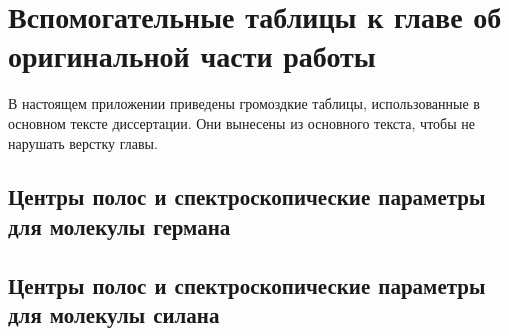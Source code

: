 \chapter{Вспомогательные таблицы к главе об оригинальной части работы}\label{app:ch2_tables}\label{app:si_tables}

В настоящем приложении приведены громоздкие таблицы, использованные в основном тексте диссертации. Они вынесены
из основного текста, чтобы не нарушать верстку главы.

\makeatletter
\newcommand{\apptablecaption}[2]{%
  \par\refstepcounter{table}\label{#1}%
  \begin{center}\small\tablename~\thetable{} --- #2\end{center}%
  \vspace{0.4ex}%
}
\makeatother



% 

% 

% 

% 

\section{Центры полос и спектроскопические параметры для молекулы германа}\label{app:ge_fit_tables}









\clearpage
\section{Центры полос и спектроскопические параметры для молекулы силана}\label{app:si_fit_tables}








